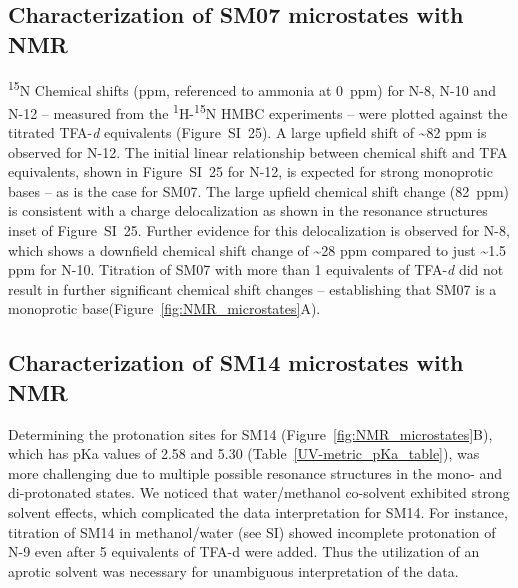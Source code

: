 \documentclass[9pt,lineno]{elife}
\begin{document}
\subsection{Characterization of SM07 microstates with NMR}

\textsuperscript{15}N Chemical shifts (ppm, referenced to ammonia at 0~ppm) for N-8, N-10 and N-12 – measured from the \textsuperscript{1}H-\textsuperscript{15}N HMBC experiments – were plotted against the titrated TFA-\textit{d} equivalents (Figure~SI~25). A large upfield shift of \textasciitilde82 ppm is observed for N-12. The initial linear relationship between chemical shift and TFA equivalents, shown in Figure~SI~25 for N-12, is expected for strong monoprotic bases – as is the case for SM07. The large upfield chemical shift change (82~ppm) is consistent with a charge delocalization as shown in the resonance structures inset of Figure~SI~25. Further evidence for this delocalization is observed for N-8, which shows a downfield chemical shift change of \textasciitilde28 ppm compared to just \textasciitilde1.5 ppm for N-10. Titration of SM07 with more than 1 equivalents of TFA-\textit{d} did not result in further significant chemical shift changes – establishing that SM07 is a monoprotic base(Figure~\ref{fig:NMR_microstates}A).

\subsection{Characterization of SM14 microstates with NMR}

Determining the protonation sites for SM14 (Figure~\ref{fig:NMR_microstates}B), which has pKa values of 2.58 and 5.30 (Table~\ref{UV-metric_pKa_table}), was more challenging due to multiple possible resonance structures in the mono- and di-protonated states. We noticed that water/methanol co-solvent exhibited strong solvent effects, which complicated the data interpretation for SM14. For instance, titration of SM14 in methanol/water (see SI) showed incomplete protonation of N-9 even after 5 equivalents of TFA-d were added. Thus the utilization of an aprotic solvent was necessary for unambiguous interpretation of the data.
\end{document}
